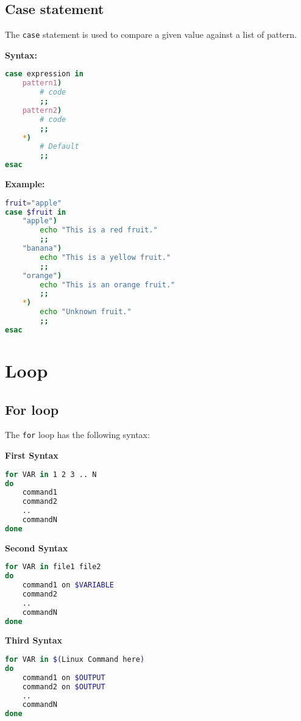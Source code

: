 \documentclass{article}
\newcommand{\inlinecode}[1]{\colorbox{backcolour}{\footnotesize{\texttt{#1}}}}
\begin{document}
\subsection{Case statement}
The \inlinecode{case} statement is used to compare a given value against a list of pattern.
\begin{paracol}{2}
	\textbf{Syntax:}
	\begin{lstlisting}[style=command, language=bash]
case expression in
    pattern1)
        # code
        ;;
    pattern2)
        # code
        ;;
    *)
        # Default
        ;;
esac
\end{lstlisting}

	\switchcolumn

	\textbf{Example:}
	\begin{lstlisting}[style=command, language=bash]
fruit="apple"
case $fruit in
    "apple")
        echo "This is a red fruit."
        ;;
    "banana")
        echo "This is a yellow fruit."
        ;;
    "orange")
        echo "This is an orange fruit."
        ;;
    *)
        echo "Unknown fruit."
        ;;
esac
\end{lstlisting}
\end{paracol}

\pagebreak

\section{Loop}

\subsection{For loop}

The \inlinecode{for} loop has the following syntax:
\begin{paracol}{3}
	\textbf{First Syntax}
	\begin{lstlisting}[style=command, language=bash]
for VAR in 1 2 3 .. N
do
    command1
    command2
    ..
    commandN
done
\end{lstlisting}
	\switchcolumn

	\textbf{Second Syntax}
	\begin{lstlisting}[style=command, language=bash]
for VAR in file1 file2
do
    command1 on $VARIABLE
    command2
    ..
    commandN
done
\end{lstlisting}

	\switchcolumn

	\textbf{Third Syntax}

	\begin{lstlisting}[style=command, language=bash]
for VAR in $(Linux Command here)
do
    command1 on $OUTPUT
    command2 on $OUTPUT
    ..
    commandN
done
\end{lstlisting}

\end{paracol}
\end{document}
